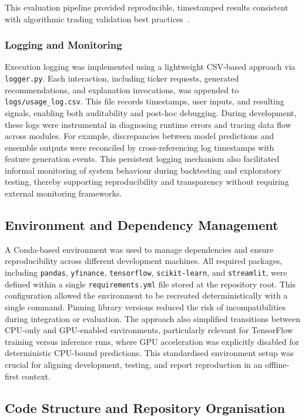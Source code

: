 This evaluation pipeline provided reproducible, timestamped results consistent with algorithmic trading validation best practices~\cite{bailey2014backtest}.

\subsubsection{Logging and Monitoring}

Execution logging was implemented using a lightweight CSV-based approach via \texttt{logger.py}. Each interaction, including ticker requests, generated recommendations, and explanation invocations, was appended to \texttt{logs/usage\_log.csv}. This file records timestamps, user inputs, and resulting signals, enabling both auditability and post-hoc debugging. During development, these logs were instrumental in diagnosing runtime errors and tracing data flow across modules. For example, discrepancies between model predictions and ensemble outputs were reconciled by cross-referencing log timestamps with feature generation events. This persistent logging mechanism also facilitated informal monitoring of system behaviour during backtesting and exploratory testing, thereby supporting reproducibility and transparency without requiring external monitoring frameworks.

\subsection{Environment and Dependency Management}

A Conda-based environment was used to manage dependencies and ensure reproducibility across different development machines. All required packages, including \texttt{pandas}, \texttt{yfinance}, \texttt{tensorflow}, \texttt{scikit-learn}, and \texttt{streamlit}, were defined within a single \texttt{requirements.yml} file stored at the repository root. This configuration allowed the environment to be recreated deterministically with a single command. Pinning library versions reduced the risk of incompatibilities during integration or evaluation. The approach also simplified transitions between CPU-only and GPU-enabled environments, particularly relevant for TensorFlow training versus inference runs, where GPU acceleration was explicitly disabled for deterministic CPU-bound predictions. This standardised environment setup was crucial for aligning development, testing, and report reproduction in an offline-first context.

\subsection{Code Structure and Repository Organisation}

